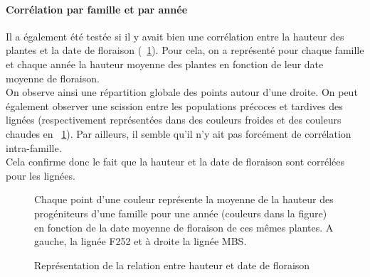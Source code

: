 \documentclass[12pt,a4paper]{article}
\begin{document}
			 				\paragraph{Corrélation par famille et par année}
			 				Il a également été testée si il y avait bien une corrélation entre la hauteur des plantes et la date de floraison (~\ref{correlation}). Pour cela, on a représenté pour chaque famille et chaque année la hauteur moyenne des plantes en fonction de leur date moyenne de floraison.\\
			 				On observe ainsi une répartition globale des points autour d'une droite. On peut également observer une scission entre les populations précoces et tardives des lignées (respectivement représentées dans des couleurs froides et des couleurs chaudes en ~\ref{correlation}). Par ailleurs, il semble qu'il n'y ait pas forcément de corrélation intra-famille.\\
			 				Cela confirme donc le fait que la hauteur et la date de floraison sont corrélées pour les lignées.
			 				
			 				\begin{figure}[!h]
			 					\caption{Représentation de la relation entre hauteur et date de floraison \label{correlation}}
			 					Chaque point d'une couleur représente la moyenne de la hauteur des progéniteurs d'une famille pour une année (couleurs dans la figure) en fonction de la date moyenne de floraison de ces mêmes plantes. A gauche, la lignée F252 et à droite la lignée MBS.
			 				\end{figure}
			 				
\end{document}
